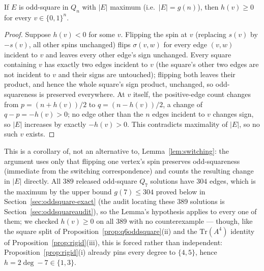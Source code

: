 \documentclass[12pt]{article}
\begin{document}
\begin{lemma}\label{lem:nonneg}
If $E$ is odd-square in $Q_n$ with $|E|$ maximum (i.e.\ $|E|=g(n)$), then
$h(v)\ge0$ for every $v\in\{0,1\}^n$.
\end{lemma}
\begin{proof}
Suppose $h(v)<0$ for some $v$. Flipping the spin at $v$ (replacing
$s(v)$ by $-s(v)$, all other spins unchanged) flips $\sigma(v,w)$ for
every edge $(v,w)$ incident to $v$ and leaves every other edge's sign
unchanged. Every square containing $v$ has exactly two edges incident
to $v$ (the square's other two edges are not incident to $v$ and their
signs are untouched); flipping both leaves their product, and hence the whole
square's sign product, unchanged, so odd-squareness is preserved
everywhere. At $v$ itself, the positive-edge count changes from
$p=(n+h(v))/2$ to $q=(n-h(v))/2$, a change of $q-p=-h(v)>0$; no edge
other than the $n$ edges incident to $v$ changes sign, so $|E|$
increases by exactly $-h(v)>0$. This contradicts maximality of $|E|$, so no such $v$ exists.
\end{proof}
This is a corollary of, not an alternative to, Lemma~\ref{lem:switching}:
the argument uses only that flipping one vertex's spin preserves
odd-squareness (immediate from the switching correspondence) and counts
the resulting change in $|E|$ directly. All $389$ released
odd-square $Q_7$ solutions have $304$ edges, which is the maximum by the
upper bound $g(7)\le304$ proved below in Section~\ref{sec:oddsquare-exact}
(the audit locating these 389 solutions is Section~\ref{sec:oddsquareaudit}), so
the Lemma's hypothesis applies to every one of them; we checked $h(v)\ge0$ on all $389$ with no counterexample --- though, like
the square split of Proposition~\ref{prop:q6oddsquare}(ii) and the
$\mathrm{Tr}(A^4)$ identity of Proposition~\ref{prop:rigid}(iii), this is
forced rather than independent: Proposition~\ref{prop:rigid}(i) already pins
every degree to $\{4,5\}$, hence $h=2\deg-7\in\{1,3\}$.
\end{document}
